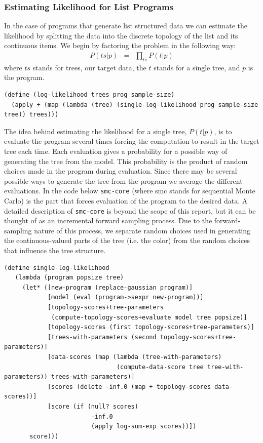 \documentclass[a4paper,10pt]{article}
\begin{document}
\subsubsection{Estimating Likelihood for List Programs}
In the case of programs that generate list structured data we can estimate the likelihood by splitting the data into the discrete topology of the list and its continuous items.  We begin by factoring the problem in the following way:
\begin{eqnarray}
P(ts|p) &=& \prod_{ts}P(t|p)
\end{eqnarray}
where $ts$ stands for trees, our target data, the $t$ stands for a single tree, and $p$ is the program.
\begin{lstlisting}[frame=trBL]
(define (log-likelihood trees prog sample-size)
  (apply + (map (lambda (tree) (single-log-likelihood prog sample-size tree)) trees)))
\end{lstlisting}
The idea behind estimating the likelihood for a single tree, $P(t|p)$, is to evaluate the program several times forcing the computation to result in the target tree each time.  Each evaluation gives a probability for a possible way of generating the tree from the model.  This probability is the product of random choices made in the program during evaluation.  Since there may be several possible ways to generate the tree from the program we average the different evaluations.  In the code below \texttt{smc-core} (where smc stands for sequential Monte Carlo) is the part that forces evaluation of the program to the desired data.  A detailed description of \texttt{smc-core} is beyond the scope of this report, but it can be thought of as an incremental forward sampling process.  Due to the forward-sampling nature of this process, we separate random choices used in generating the continuous-valued parts of the tree (i.e. the color) from the random choices that influence the tree structure.
\begin{lstlisting}[frame=trBL]
(define single-log-likelihood 
   (lambda (program popsize tree)
     (let* ([new-program (replace-gaussian program)]
            [model (eval (program->sexpr new-program))]
            [topology-scores+tree-parameters 
             (compute-topology-scores+evaluate model tree popsize)]
            [topology-scores (first topology-scores+tree-parameters)]
            [trees-with-parameters (second topology-scores+tree-parameters)]
            [data-scores (map (lambda (tree-with-parameters) 
                               (compute-data-score tree tree-with-parameters)) trees-with-parameters)]
            [scores (delete -inf.0 (map + topology-scores data-scores))]
            [score (if (null? scores)
                        -inf.0
                        (apply log-sum-exp scores))])
       score)))
\end{lstlisting}
\end{document}
